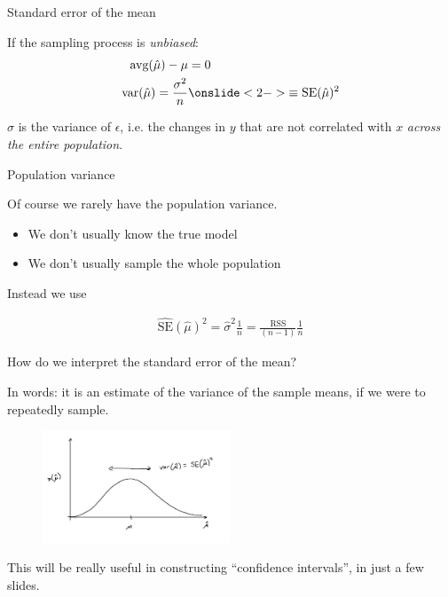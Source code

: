 \documentclass[aspectratio=169]{beamer}
\begin{document}
\begin{frame}{Standard error of the mean}

If the sampling process is \textit{unbiased}:
\begin{align*}
\text{avg}(\hat{\mu}) - \mu &= 0\\
\text{var}(\hat{\mu}) = \frac{\sigma^2}{n} &\onslide<2->{\equiv \text{SE}(\hat{\mu})^2}
\end{align*}

\pause
$\sigma$ is the variance of $\epsilon$, i.e. the changes in $y$ that are not correlated with $x$ \textit{across the entire population}.

\vspace{5mm}

\end{frame}

\begin{frame}{Population variance}

Of course we rarely have the population variance.  
\begin{itemize}
\item We don't usually know the true model
\item We don't usually sample the whole population
\end{itemize}

\vspace{5mm}

Instead we use

\begin{align*}
\hat{\text{SE}}(\hat{\mu})^2 = \hat{\sigma}^2\frac{1}{n} = \frac{\text{RSS}}{(n-1)}\frac{1}{n}
\end{align*}
\end{frame}

\begin{frame}{How do we interpret the standard error of the mean?}

In words: it is an estimate of the variance of the sample means, if we were to repeatedly sample.

\pause
\begin{figure}
\includegraphics[width=0.5\textwidth]{figures/sample_mean_dist}
\end{figure}

This will be really useful in constructing ``confidence intervals'', in just a few slides.
\end{frame}
\end{document}

